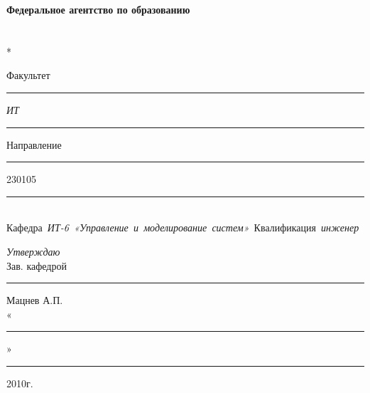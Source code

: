 
\begin{center}
\textbf{Федеральное агентство по образованию} \\
\vspace{0.5cm}
\\
\\*
\end{center}

\begin{center}
Факультет\rule{2cm}{0.5pt}\textit{ИТ}\rule{2cm}{0.5pt} Направление \rule{2.8cm}{0.5pt} 230105\rule{2.8cm}{0.5pt} \\

\mbox{Кафедра \textit{ИТ-6 «Управление и моделирование систем»} Квалификация \textit{инженер} } \\

\end{center}

\begin{flushright}
\textit{Утверждаю} \\
Зав. кафедрой \\
\rule{2.9cm}{0.5pt} Мацнев А.П. \\
«\rule{1cm}{0.5pt}»\rule{3cm}{0.5pt} 2010г.
\end{flushright}

